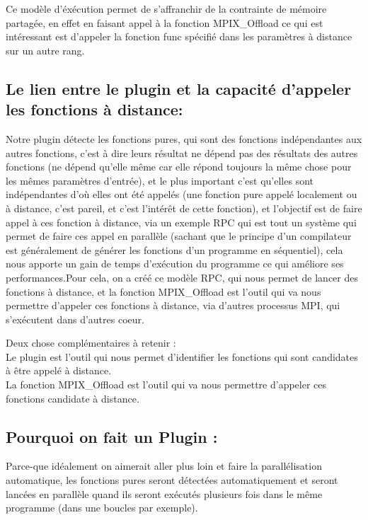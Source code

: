 \documentclass[12pt,titlepage]{article}
\begin{document}
Ce modèle d'éxécution permet de s'affranchir de la contrainte de mémoire partagée, en effet en faisant appel à la fonction MPIX\_Offload ce qui est intéressant est d'appeler la fonction func spécifié dans les paramètres à distance sur un autre rang.

\subsection{Le lien entre le plugin et la capacité d'appeler les fonctions à distance:}

Notre plugin détecte les fonctions pures, qui sont des fonctions indépendantes aux autres fonctions, c'est à dire leurs résultat ne dépend pas des résultats des autres fonctions (ne dépend qu'elle même car elle répond toujours la même chose pour les mêmes paramètres d'entrée), et le plus important c'est qu'elles sont indépendantes d'où elles ont été appelés (une fonction pure appelé localement ou à distance, c'est pareil, et c'est l'intérêt de cette fonction), et l'objectif est de faire appel à ces fonction à distance, via un exemple RPC qui est tout un système qui permet de faire ces appel en parallèle (sachant que le principe d'un compilateur est généralement de générer les fonctions d'un programme en séquentiel), cela nous apporte un gain de temps d’exécution du programme ce qui améliore ses performances.Pour cela, on a créé ce modèle RPC, qui nous permet de lancer des fonctions à distance, et la fonction MPIX\_Offload est l'outil qui va nous permettre d'appeler ces fonctions à distance, via d'autres processus MPI, qui s'exécutent dans d'autres coeur.

Deux chose complémentaires à retenir :\\
Le plugin est l'outil qui nous permet d'identifier les fonctions qui sont candidates à être appelé à distance.\\
La fonction MPIX\_Offload est l'outil qui va nous permettre d'appeler ces fonctions candidate à distance.

\subsection{Pourquoi on fait un Plugin :}

Parce-que idéalement on aimerait aller plus loin et faire la parallélisation automatique, les fonctions pures seront détectées automatiquement et seront lancées en parallèle quand ils seront exécutés plusieurs fois dans le même programme (dans une boucles par exemple).\\
\end{document}

